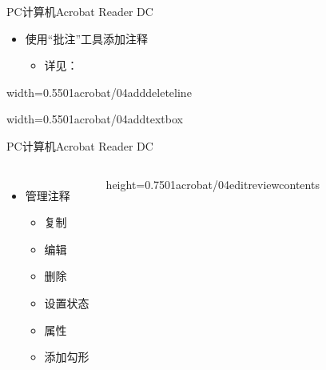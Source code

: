 \documentclass[fontset = none, t, aspectratio=169]{ctexbeamer}
\begin{document}
\begin{frame}{PC计算机}{Acrobat Reader DC}
  \begin{itemize}
  \item 使用\enquote{批注}工具添加注释
    \begin{itemize}
    \item 详见：
    \end{itemize}
  \end{itemize}
  
  \begin{center}
    \begin{annotationimage}{width=0.55\textwidth}{01acrobat/04adddeleteline}      
    \end{annotationimage}
    \begin{annotationimage}{width=0.55\textwidth}{01acrobat/04addtextbox}      
    \end{annotationimage}
  \end{center}
\end{frame}

\begin{frame}{PC计算机}{Acrobat Reader DC}
  \begin{columns}[t]
    \begin{itemize}
    \item 管理注释
      \begin{itemize}\itemsep=10pt
      \item 复制
      \item 编辑
      \item 删除
      \item 设置状态
      \item 属性
      \item 添加勾形
      \end{itemize}
    \end{itemize}
    \begin{center}
      \begin{annotationimage}{height=0.75\textheight}{01acrobat/04editreviewcontents}
      \end{annotationimage}
    \end{center}
  \end{columns}
\end{frame}
\end{document}
